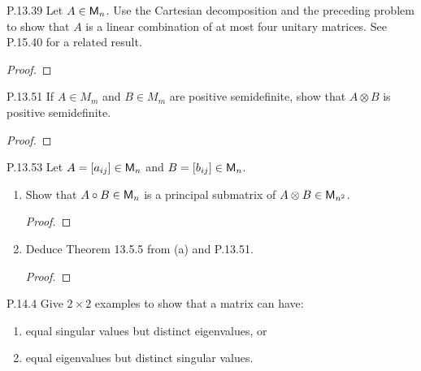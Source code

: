 \documentclass{../homework}
\begin{document}
\begin{problems}
\item[P.13.39] Let \(A \in \mathsf{M}_n\).  Use the Cartesian decomposition
  and the preceding problem to show that \(A\) is a linear combination
  of at most four unitary matrices.  See P.15.40 for a related result.

  \begin{solution}
    \begin{proof}

    \end{proof}
  \end{solution}

\item[P.13.51] If \(A \in M_m\) and \(B \in M_m\) are positive semidefinite,
  show that \(A \otimes B\) is positive semidefinite.

  \begin{solution}
    \begin{proof}

    \end{proof}
  \end{solution}

\item[P.13.53] Let \(A = [a_{ij}] \in \mathsf{M}_n\) and
  \(B = [b_{ij}] \in \mathsf{M}_n\).
  \begin{enumerate}
  \item Show that \(A \circ B \in \mathsf{M}_n\) is a principal submatrix of
    \(A \otimes B \in \mathsf{M}_{n^2}\).

    \begin{solution}
      \begin{proof}

      \end{proof}
    \end{solution}

  \item Deduce Theorem 13.5.5 from (a) and P.13.51.

    \begin{solution}
      \begin{proof}

      \end{proof}
    \end{solution}
  \end{enumerate}

  \begin{solution}
  \end{solution}

\item[P.14.4] Give \(2 \times 2\) examples to show that a matrix can
  have:
  \begin{enumerate}
  \item equal singular values but distinct eigenvalues, or

    \begin{solution}

    \end{solution}

  \item equal eigenvalues but distinct singular values.
    \begin{solution}

    \end{solution}
  \end{enumerate}
\end{problems}
\end{document}

